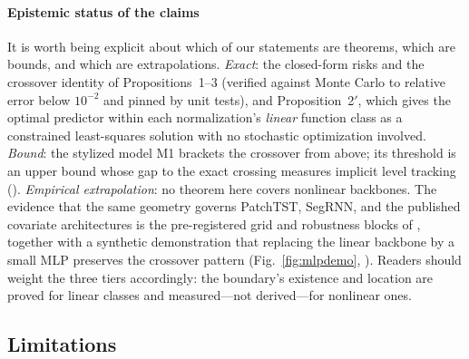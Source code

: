\paragraph{Epistemic status of the claims}
It is worth being explicit about which of our statements are theorems,
which are bounds, and which are extrapolations. \emph{Exact}: the
closed-form risks and the crossover identity of
Propositions~1--3 (verified against Monte Carlo to relative error below
$10^{-2}$ and pinned by unit tests), and Proposition~2$'$, which gives the
optimal predictor within each normalization's \emph{linear} function class
as a constrained least-squares solution with no stochastic optimization
involved. \emph{Bound}: the stylized model M1 brackets the crossover from
above; its threshold is an upper bound whose gap to the exact crossing
measures implicit level tracking (). \emph{Empirical
extrapolation}: no theorem here covers nonlinear backbones. The evidence
that the same geometry governs PatchTST, SegRNN, and the published covariate
architectures is the pre-registered grid and robustness blocks of
, together with a synthetic demonstration that
replacing the linear backbone by a small MLP preserves the crossover
pattern (Fig.~\ref{fig:mlpdemo}, ). Readers should weight the
three tiers accordingly: the boundary's existence and location are proved
for linear classes and measured---not derived---for nonlinear ones.

\subsection{Limitations}


